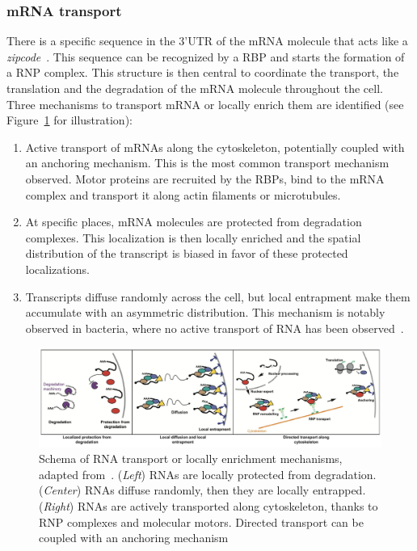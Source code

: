 \subsubsection{mRNA transport}

There is a specific sequence in the 3'UTR of the \ac{mRNA} molecule that acts like a \emph{zipcode}~\cite{Chabanon_2004}.
This sequence can be recognized by a \ac{RBP} and starts the formation of a \ac{RNP} complex.
This structure is then central to coordinate the transport, the translation and the degradation of the \ac{mRNA} molecule throughout the cell.\\

\noindent
Three mechanisms to transport \ac{mRNA} or locally enrich them are identified (see Figure~\ref{fig:rna_transport} for illustration):
\begin{enumerate}
	\setlength\itemsep{0.1em}
	\item Active transport of \ac{mRNA}s along the cytoskeleton, potentially coupled with an anchoring mechanism.
	This is the most common transport mechanism observed.
	Motor proteins are recruited by the \ac{RBP}s, bind to the \ac{mRNA} complex and transport it along actin filaments or microtubules.
	\item At specific places, \ac{mRNA} molecules are protected from degradation complexes.
	This localization is then locally enriched and the spatial distribution of the transcript is biased in favor of these protected localizations.
	\item Transcripts diffuse randomly across the cell, but local entrapment make them accumulate with an asymmetric distribution.
	This mechanism is notably observed in bacteria, where no active transport of \ac{RNA} has been observed~\cite{das_intracellular_2021}.
\end{enumerate}

\begin{figure}[]
    \centering
    \includegraphics[width=\textwidth]{figures/introduction/rna_transport}
    \caption[Schema of RNA transport or locally enrichment mechanisms]{Schema of RNA transport or locally enrichment mechanisms, adapted from~\cite{Medioni_2012}.
	(\textit{Left}) RNAs are locally protected from degradation.
	(\textit{Center}) RNAs diffuse randomly, then they are locally entrapped.
	(\textit{Right}) RNAs are actively transported along cytoskeleton, thanks to RNP complexes and molecular motors.
	Directed transport can be coupled with an anchoring mechanism}
    \label{fig:rna_transport}
\end{figure}

